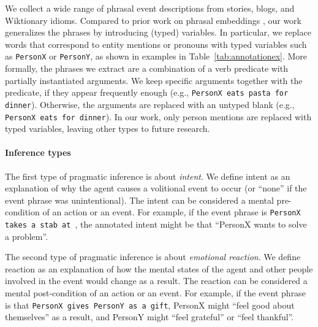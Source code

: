 \documentclass[11pt,a4paper]{article}
\newcommand{\blank}{\xspace}
\begin{document}
We collect a wide range of phrasal event descriptions from stories, blogs, and Wiktionary  idioms. Compared to prior work on phrasal embeddings \cite{Wieting2015FromPD,Pavlick2015PPDB2B}, our work  generalizes the phrases by introducing (typed) variables. In particular, we replace words that correspond to entity mentions or pronouns with typed variables such as \texttt{PersonX} or \texttt{PersonY}, as shown in examples in Table~\ref{tab:annotationex}. More formally, the phrases we extract are a combination of a verb predicate with partially instantiated arguments. We keep specific arguments   together with the predicate, if they appear frequently enough (e.g., \texttt{PersonX eats pasta for dinner}). Otherwise, the arguments are replaced with an untyped blank (e.g., \texttt{PersonX eats \blank for dinner}). In our work, only person mentions are replaced with typed variables, leaving other types to future research.



\paragraph{Inference types} 
The first type of pragmatic inference is about \textit{intent}.
We define intent as an explanation of why the agent causes a volitional event to occur (or ``none'' if the event phrase was unintentional). The intent can be considered a mental pre-condition of an action or an event.  For example, if the event phrase is \texttt{PersonX takes a stab at \blank}, the annotated intent might be that ``PersonX wants to solve a problem''.

The second type of pragmatic inference is about \textit{emotional reaction}. 
We define reaction as an explanation of how the mental states of the agent and other people involved in the event would change as a result. The reaction can be considered a mental post-condition of an action or an event.  For example, if the event phrase is that \texttt{PersonX gives PersonY \blank as a gift}, PersonX might ``feel good about themselves'' as a result, and PersonY might ``feel grateful'' or ``feel thankful''.
\end{document}
